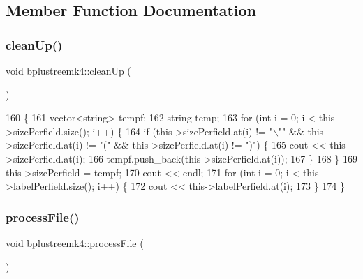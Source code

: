 \subsection{Member Function Documentation}
\mbox{\label{classbplustreemk4_a6bca01d3bcc5461d899975b18c3d4c86}} 
\subsubsection{\texorpdfstring{clean\+Up()}{cleanUp()}}
{\footnotesize\ttfamily void bplustreemk4\+::clean\+Up (\begin{DoxyParamCaption}{ }\end{DoxyParamCaption})}


\begin{DoxyCode}
160                            \{
161     vector<string> tempf;
162     \textcolor{keywordtype}{string} temp;
163     \textcolor{keywordflow}{for} (\textcolor{keywordtype}{int} i = 0; i < this->sizePerfield.size(); i++) \{
164         \textcolor{keywordflow}{if} (this->sizePerfield.at(i) != \textcolor{stringliteral}{"\(\backslash\)""} && this->sizePerfield.at(i) != \textcolor{stringliteral}{"("} && this->sizePerfield.at(i)
       != \textcolor{stringliteral}{")"}) \{
165             cout << this->sizePerfield.at(i);
166             tempf.push\_back(this->sizePerfield.at(i));
167         \}   
168     \}
169     this->sizePerfield = tempf;
170     cout << endl;
171     \textcolor{keywordflow}{for} (\textcolor{keywordtype}{int} i = 0; i < this->labelPerfield.size(); i++) \{
172         cout << this->labelPerfield.at(i);
173     \}
174 \}
\end{DoxyCode}
\mbox{\label{classbplustreemk4_abeaaa5003e7a3e2b0e99619ad718e14d}} 
\subsubsection{\texorpdfstring{process\+File()}{processFile()}}
{\footnotesize\ttfamily void bplustreemk4\+::process\+File (\begin{DoxyParamCaption}{ }\end{DoxyParamCaption})}


